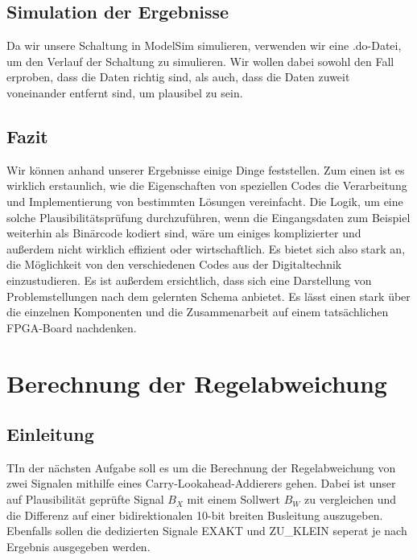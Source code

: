 \documentclass{report}
\begin{document}
\section{Simulation der Ergebnisse}
\label{sec:simul-der-ergebn}

Da wir unsere Schaltung in ModelSim simulieren, verwenden wir eine .do-Datei, um den Verlauf der Schaltung zu simulieren. Wir wollen dabei sowohl den Fall erproben, dass die Daten richtig sind, als auch, dass die Daten zuweit voneinander entfernt sind, um plausibel zu sein.






\section{Fazit}
\label{sec:fazit}

Wir können anhand unserer Ergebnisse einige Dinge feststellen. Zum einen ist es wirklich erstaunlich, wie die Eigenschaften von speziellen Codes die Verarbeitung und Implementierung von bestimmten Lösungen vereinfacht. Die Logik, um eine solche Plausibilitätsprüfung durchzuführen, wenn die Eingangsdaten zum Beispiel weiterhin als Binärcode kodiert sind, wäre um einiges komplizierter und außerdem nicht wirklich effizient oder wirtschaftlich. Es bietet sich also stark an, die Möglichkeit von den verschiedenen Codes aus der Digitaltechnik einzustudieren. Es ist außerdem ersichtlich, dass sich eine Darstellung von Problemstellungen nach dem gelernten Schema anbietet. Es lässt einen stark über die einzelnen Komponenten und die Zusammenarbeit auf einem tatsächlichen FPGA-Board nachdenken.


\renewcommand{\thechapter}{B}

\chapter{Berechnung der Regelabweichung}
\label{cha:berechn-der-regel}

\section{Einleitung}
\label{sec:einleitung-1}

\begin{task}
  TIn der nächsten Aufgabe soll es um die Berechnung der Regelabweichung von zwei Signalen mithilfe eines Carry-Lookahead-Addierers gehen. Dabei ist unser auf Plausibilität geprüfte Signal $B_X$ mit einem Sollwert $B_{W}$ zu vergleichen und die Differenz auf einer bidirektionalen 10-bit breiten Busleitung auszugeben. Ebenfalls sollen die dedizierten Signale EXAKT und ZU\_KLEIN seperat je nach Ergebnis ausgegeben werden.

\end{task}
\end{document}
